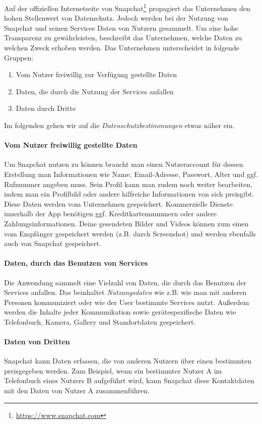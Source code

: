 Auf der offiziellen Internetseite von
Snapchat\footnote{\url{https://www.snapchat.com}} propagiert das Unternehmen
den hohen Stellenwert von Datenschutz. Jedoch werden bei der Nutzung von
Snapchat und seinen Services Daten von Nutzern gesammelt. Um eine hohe
Transparenz zu gew\"ahrleisten, beschreibt das Unternehmen, welche Daten zu
welchen Zweck erhoben werden. Das Unternehmen unterscheidet in folgende
Gruppen:
\begin{enumerate}
	\item Vom Nutzer freiwillig zur Verf\"ugung gestellte Daten
	\item Daten, die durch die Nutzung der Services anfallen
	\item Daten durch Dritte
\end{enumerate}
Im folgenden gehen wir auf die \emph{Datenschutzbestimmungen} etwas
n\"aher ein.

\paragraph{Vom Nutzer freiwillig gestellte Daten}
Um Snapchat nutzen zu k\"onnen braucht man einen Nutzeraccount f\"ur dessen
Erstellung man Informationen wie Name, Email-Adresse, Passwort, Alter und ggf.
Rufnummer angeben muss. Sein Profil kann man zudem noch weiter bearbeiten,
indem man ein Profilbild oder andere hilfreiche Informationen von sich
preisgibt. Diese Daten werden vom Unternehmen gespeichert. Kommerzielle Dienste
innerhalb der App ben\"otigen ggf.  Kreditkartennummern oder andere
Zahlungsinformationen. Deine gesendeten Bilder und Videos k\"onnen zum einen
vom Empf\"anger gespeichert werden (z.B. durch Screenshot) und werden ebenfalls
auch von Snapchat gespeichert.

\paragraph{Daten, durch das Benutzen von Services}
Die Anwendung sammelt eine Vielzahl von Daten, die durch das Benutzen der
Services anfallen. Das beinhaltet \emph{Nutzungsdaten} wie z.B. wie man mit
anderen Personen kommuniziert oder wie der User bestimmte Services nutzt.
Au{\ss}erdem werden die Inhalte jeder Kommunikation sowie ger\"atespezifische
Daten wie Telefonbuch, Kamera, Gallery und Standortdaten gespeichert.

\paragraph{Daten von Dritten}
Snapchat kann Daten erfassen, die von anderen Nutzern \"uber einen bestimmten
preisgegeben werden. Zum Beispiel, wenn ein bestimmter Nutzer A im Telefonbuch
eines Nutzers B aufgef\"uhrt wird, kann Snapchat diese Kontaktdaten mit den
Daten von Nutzer A zusammenf\"uhren.

